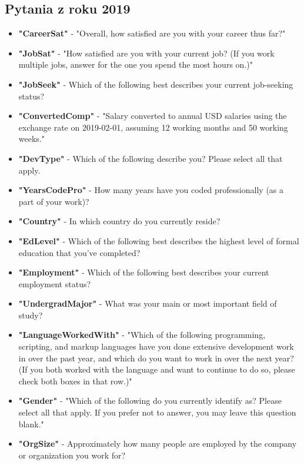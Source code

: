 \begin{appendices}
    \section{Pytania z roku 2019}\label{pytania-2019}
    \begin{itemize}
        \item \textbf{"CareerSat"} - "Overall, how satisfied are you with your career thus far?"
        \item \textbf{"JobSat"} - "How satisfied are you with your current job? (If you work multiple jobs, answer for the one you spend the most hours on.)"
        \item \textbf{"JobSeek"} - Which of the following best describes your current job-seeking status?
        \item \textbf{"ConvertedComp"} - "Salary converted to annual USD salaries using the exchange rate on 2019-02-01, assuming 12 working months and 50 working weeks."
        \item \textbf{"DevType"} - Which of the following describe you? Please select all that apply.
        \item \textbf{"YearsCodePro"} - How many years have you coded professionally (as a part of your work)?
        \item \textbf{"Country"} - In which country do you currently reside?
        \item \textbf{"EdLevel"} - Which of the following best describes the highest level of formal education that you’ve completed?
        \item \textbf{"Employment"} - Which of the following best describes your current employment status?
        \item \textbf{"UndergradMajor"} - What was your main or most important field of study?
        \item \textbf{"LanguageWorkedWith"} - "Which of the following programming, scripting, and markup languages have you done extensive development work in over the past year, and which do you want to work in over the next year?  (If you both worked with the language and want to continue to do so, please check both boxes in that row.)"
        \item \textbf{"Gender"} - "Which of the following do you currently identify as? Please select all that apply. If you prefer not to answer, you may leave this question blank."
        \item \textbf{"OrgSize"} - Approximately how many people are employed by the company or organization you work for?

\end{itemize}
\end{appendices}
